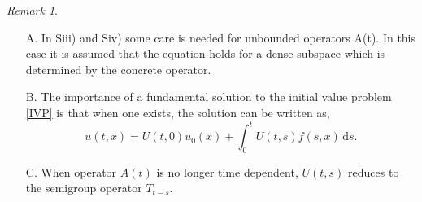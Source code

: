 \documentclass[a4paper, 12pt]{report}
\theoremstyle{remark}
\newtheorem{remark}[theorem]{Remark}
\theoremstyle{definition}
\begin{document}
\begin{remark}\label{TDSFSR1}
\hspace{0.5cm}
\begin{itemize}
\item[A.] In Siii) and Siv) some care is needed for unbounded operators A(t). In this case it is assumed that the equation holds for a dense subspace which is determined by the concrete operator.

\item[B.] The importance of a fundamental solution to the initial value problem \eqref{IVP} is that when one exists, the solution can be written as,
$$
u(t, x) = U(t, 0)u_0(x) + \int_0^tU(t, s)f(s, x)\,\mathrm{d}s.
$$

\item[C.] When operator $A(t)$ is no longer time dependent, $U(t, s)$ reduces to the semigroup operator $T_{t - s}$.
\end{itemize}
\end{remark}
\end{document}
